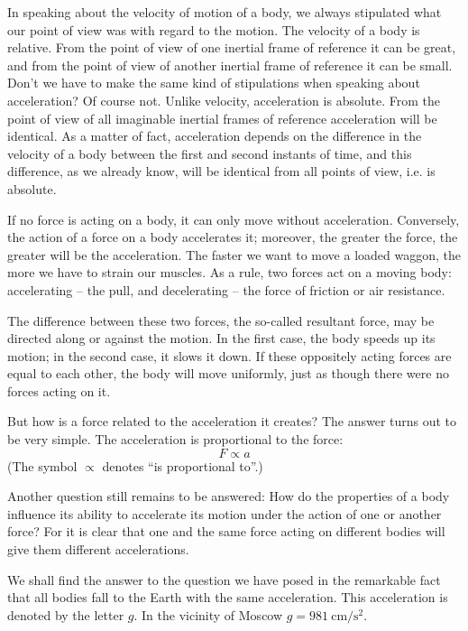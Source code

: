 In speaking about the velocity of motion of a body,
we always stipulated what our point of view was with
regard to the motion. The velocity of a body is relative.
From the point of view of one inertial frame of reference
it can be great, and from the point of view of another
inertial frame of reference it can be small. Don't we have
to make the same kind of stipulations when speaking
about acceleration? Of course not. Unlike velocity, acceleration is absolute. From the point of view of all imaginable inertial frames of reference acceleration will be identical. As a matter of fact, acceleration depends on the difference in the velocity of a body between the first and second instants of time, and this difference, as we already know, will be identical from all points of view,
i.e. is absolute.

If no force is acting on a body, it can only move without acceleration. Conversely, the action of a force on a body accelerates it; moreover, the greater the force, the greater will be the acceleration. The faster we want to move a loaded waggon, the more we have to strain our muscles. As a rule, two forces act on a moving body: accelerating -- the pull, and decelerating -- the force of friction or air resistance.

The difference between these two forces, the so-called
resultant force, may be directed along or against the
motion. In the first case, the body speeds up its motion;
in the second case, it slows it down. If these oppositely
acting forces are equal to each other, the body will move
uniformly, just as though there were no forces acting
on it.

But how is a force related to the acceleration it creates?
The answer turns out to be very simple. The acceleration
is proportional to the force:
\begin{equation*}%
F \propto a
\end{equation*}
(The symbol $\propto$ denotes ``is proportional to''.)

Another question still remains to be answered: How do
the properties of a body influence its ability to accelerate
its motion under the action of one or another force? For
it is clear that one and the same force acting on different
bodies will give them different accelerations.

We shall find the answer to the question we have posed
in the remarkable fact that all bodies fall to the Earth
with the same acceleration. This acceleration is denoted
by the letter $g$. In the vicinity of Moscow $g = \SI{981}{\centi\meter\per\second\squared}$.

